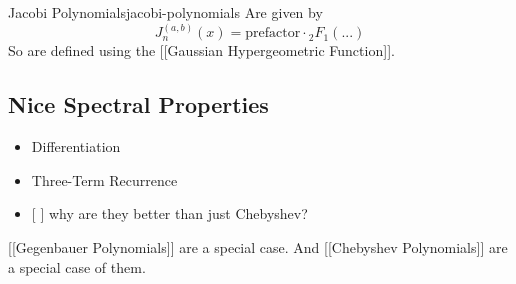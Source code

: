 \begin{definition}{Jacobi Polynomials}{jacobi-polynomials}
  Are given by \[J^{(a,b)}_n(x) = \mathrm{prefactor} \cdot {}_2F_1(...)\]
  So are defined using the {[}{[}Gaussian Hypergeometric Function{]}{]}.

  \hypertarget{nice-spectral-properties}{%
    \subsection{Nice Spectral Properties}\label{nice-spectral-properties}}

  \begin{itemize}
    \item
          Differentiation
    \item
          Three-Term Recurrence
    \item
          {[} {]} why are they better than just Chebyshev?
  \end{itemize}

  {[}{[}Gegenbauer Polynomials{]}{]} are a special case. And
  {[}{[}Chebyshev Polynomials{]}{]} are a special case of them.
\end{definition}
